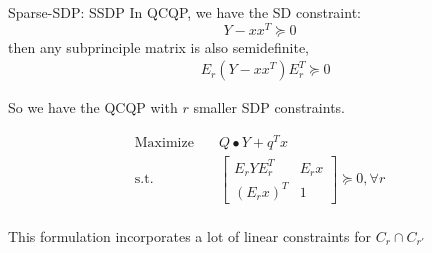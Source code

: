 \begin{frame}{Sparse-SDP: SSDP}
  In QCQP, we have the SD constraint:
  \[Y - xx^T \succeq 0\]
  then any subprinciple matrix is also semidefinite,
  \begin{equation}
    \begin{aligned}
       & E_r (Y - x x^T) E_r^T \succeq 0
    \end{aligned}
  \end{equation}

  So we have the QCQP with \(r\) smaller SDP constraints.

  \[\begin{aligned}
      \mathrm{Maximize}\quad & Q \bullet Y + q^Tx                               \\
      \mathrm{s.t.} \quad    & \begin{bmatrix}E_r Y E_r^T & E_rx \\ (E_rx)^T & 1\end{bmatrix}   \succeq 0, \forall r \\
    \end{aligned}\]

  This formulation incorporates a lot of linear constraints for \(C_r \cap C_{r'}\)
\end{frame}
